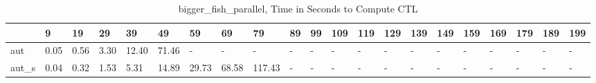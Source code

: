 \begin{table}
\caption{bigger_fish_parallel, Time in Seconds to Compute CTL}
\label{bigger_fish_parallel_CTL_time}
\begin{tabular}{lllllllllllllllllllll}
\toprule
 & 9 & 19 & 29 & 39 & 49 & 59 & 69 & 79 & 89 & 99 & 109 & 119 & 129 & 139 & 149 & 159 & 169 & 179 & 189 & 199 \\
\midrule
aut & 0.05 & 0.56 & 3.30 & 12.40 & 71.46 & - & - & - & - & - & - & - & - & - & - & - & - & - & - & - \\
aut_s & 0.04 & 0.32 & 1.53 & 5.31 & 14.89 & 29.73 & 68.58 & 117.43 & - & - & - & - & - & - & - & - & - & - & - & - \\
\bottomrule
\end{tabular}
\end{table}

